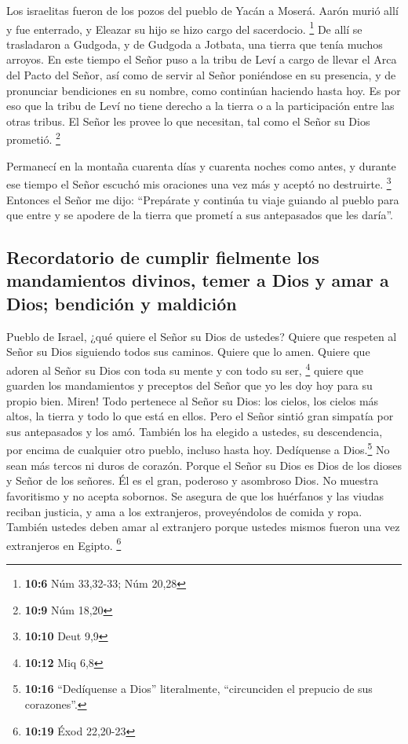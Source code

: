  Los israelitas fueron de los pozos del pueblo de Yacán a
Moserá. Aarón murió allí y fue enterrado, y Eleazar su hijo se hizo
cargo del sacerdocio. \footnote{\textbf{10:6} Núm 33,32-33; Núm 20,28}
 De allí se trasladaron a Gudgoda, y de Gudgoda a Jotbata,
una tierra que tenía muchos arroyos.  En este tiempo el
Señor puso a la tribu de Leví a cargo de llevar el Arca del Pacto del
Señor, así como de servir al Señor poniéndose en su presencia, y de
pronunciar bendiciones en su nombre, como continúan haciendo hasta hoy.
 Es por eso que la tribu de Leví no tiene derecho a la
tierra o a la participación entre las otras tribus. El Señor les provee
lo que necesitan, tal como el Señor su Dios prometió. \footnote{\textbf{10:9}
  Núm 18,20}

 Permanecí en la montaña cuarenta días y cuarenta noches
como antes, y durante ese tiempo el Señor escuchó mis oraciones una vez
más y aceptó no destruirte. \footnote{\textbf{10:10} Deut 9,9}
 Entonces el Señor me dijo: ``Prepárate y continúa tu
viaje guiando al pueblo para que entre y se apodere de la tierra que
prometí a sus antepasados que les daría''.

\hypertarget{recordatorio-de-cumplir-fielmente-los-mandamientos-divinos-temer-a-dios-y-amar-a-dios-bendiciuxf3n-y-maldiciuxf3n}{%
\subsection{Recordatorio de cumplir fielmente los mandamientos divinos,
temer a Dios y amar a Dios; bendición y
maldición}\label{recordatorio-de-cumplir-fielmente-los-mandamientos-divinos-temer-a-dios-y-amar-a-dios-bendiciuxf3n-y-maldiciuxf3n}}

 Pueblo de Israel, ¿qué quiere el Señor su Dios de
ustedes? Quiere que respeten al Señor su Dios siguiendo todos sus
caminos. Quiere que lo amen. Quiere que adoren al Señor su Dios con toda
su mente y con todo su ser, \footnote{\textbf{10:12} Miq 6,8}
 quiere que guarden los mandamientos y preceptos del
Señor que yo les doy hoy para su propio bien.  Miren!
Todo pertenece al Señor su Dios: los cielos, los cielos más altos, la
tierra y todo lo que está en ellos.  Pero el Señor sintió
gran simpatía por sus antepasados y los amó. También los ha elegido a
ustedes, su descendencia, por encima de cualquier otro pueblo, incluso
hasta hoy.  Dedíquense a Dios.\footnote{\textbf{10:16}
  ``Dedíquense a Dios'' literalmente, ``circunciden el prepucio de sus
  corazones''.} No sean más tercos ni duros de corazón. 
Porque el Señor su Dios es Dios de los dioses y Señor de los señores. Él
es el gran, poderoso y asombroso Dios. No muestra favoritismo y no
acepta sobornos.  Se asegura de que los huérfanos y las
viudas reciban justicia, y ama a los extranjeros, proveyéndolos de
comida y ropa.  También ustedes deben amar al extranjero
porque ustedes mismos fueron una vez extranjeros en Egipto. \footnote{\textbf{10:19}
  Éxod 22,20-23}

